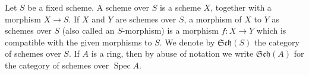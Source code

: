 Let $S$ be a fixed scheme. A scheme over $S$ is a scheme $X$, together with a morphism $X \rightarrow S$. If $X$ and $Y$ are schemes over $S$, a morphism of $X$ to $Y$ as schemes over $S$ (also called an $S$-morphism) is a morphism $f: X \rightarrow Y$ which is compatible with the given morphisms to $S$. We denote by $\mathfrak{Sch}(S)$ the category of schemes over $S$. If $A$ is a ring, then by abuse of notation we write $\mathfrak{Sch}(A)$ for the category of schemes over $\operatorname{Spec} A$.
